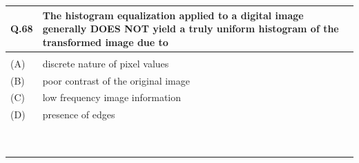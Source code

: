 \documentclass[12pt]{article}
\begin{document}
\begin{table}[H]
\renewcommand{\arraystretch}{3}
\setlength{\tabcolsep}{8pt}
\begin{tabular}{|l|p{15cm}|}
\hline

Q.68 &The histogram equalization applied to a digital image generally DOES NOT yield
a truly uniform histogram of the transformed image due to\\ \hline
    & \\ \hline
(A)&discrete nature of pixel values\\ \hline
(B)&poor contrast of the original image\\ \hline
(C)&low frequency image information\\ \hline
(D)&presence of edges\\ \hline
& \\ 
& \\ 
& \\ 
& \\ 
& \\ 
& \\ 
& \\ 
& \\ 
& \\ \hline

\end{tabular}
\end{table} 
\newpage
\end{document}
